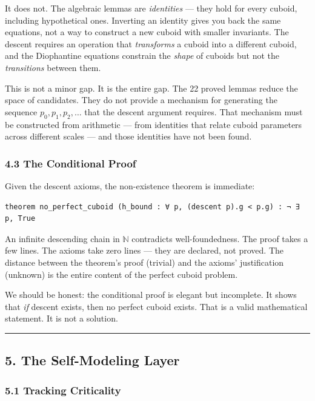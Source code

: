 It does not. The algebraic lemmas are \emph{identities} --- they hold
for every cuboid, including hypothetical ones. Inverting an identity
gives you back the same equations, not a way to construct a new cuboid
with smaller invariants. The descent requires an operation that
\emph{transforms} a cuboid into a different cuboid, and the Diophantine
equations constrain the \emph{shape} of cuboids but not the
\emph{transitions} between them.

This is not a minor gap. It is the entire gap. The 22 proved lemmas
reduce the space of candidates. They do not provide a mechanism for
generating the sequence \(p_0, p_1, p_2, \ldots\) that the descent
argument requires. That mechanism must be constructed from arithmetic
--- from identities that relate cuboid parameters across different
scales --- and those identities have not been found.

\subsubsection{4.3 The Conditional Proof}\label{the-conditional-proof}

Given the descent axioms, the non-existence theorem is immediate:

\begin{verbatim}
theorem no_perfect_cuboid (h_bound : ∀ p, (descent p).g < p.g) : ¬ ∃ p, True
\end{verbatim}

An infinite descending chain in \(\mathbb{N}\) contradicts
well-foundedness. The proof takes a few lines. The axioms take zero
lines --- they are declared, not proved. The distance between the
theorem's proof (trivial) and the axioms' justification (unknown) is the
entire content of the perfect cuboid problem.

We should be honest: the conditional proof is elegant but incomplete. It
shows that \emph{if} descent exists, then no perfect cuboid exists. That
is a valid mathematical statement. It is not a solution.

\begin{center}\rule{0.5\linewidth}{0.5pt}\end{center}

\subsection{5. The Self-Modeling Layer}\label{the-self-modeling-layer}

\subsubsection{5.1 Tracking Criticality}\label{tracking-criticality}

